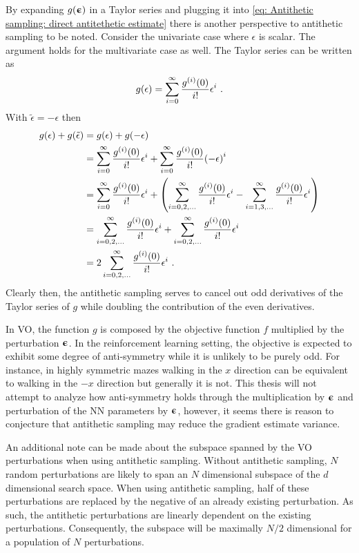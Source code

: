 By expanding $g({\boldsymbol{\upepsilon}})$ in a Taylor series and plugging it into \eqref{eq: Antithetic sampling: direct antitethetic estimate} there is another perspective to antithetic sampling to be noted. Consider the univariate case where $\epsilon$ is scalar. The argument holds for the multivariate case as well. The Taylor series can be written as
\begin{equation}
    g(\epsilon) = \sum_{i=0}^\infty \frac{g^{\left(i\right)}(0)}{i!}\epsilon^i \ .
\end{equation}
With $\tilde{\epsilon}=-\epsilon$ then
\begin{align}
    g(\epsilon) + g(\tilde{\epsilon})
    &= g(\epsilon) + g(-\epsilon)\\
    &= \sum_{i=0}^\infty \frac{g^\pa{i}(0)}{i!}\epsilon^i + \sum_{i=0}^\infty \frac{g^\pa{i}(0)}{i!}\pa{-\epsilon}^i\\
    &= \sum_{i=0}^\infty \frac{g^\pa{i}(0)}{i!}\epsilon^i + \pa{\sum_{i=0,2,\dots}^\infty \frac{g^\pa{i}(0)}{i!}\epsilon^i - \sum_{i=1,3,\dots}^\infty \frac{g^\pa{i}(0)}{i!}\epsilon^i}\\
    &= \sum_{i=0,2,\dots}^\infty \frac{g^\pa{i}(0)}{i!}\epsilon^i + \sum_{i=0,2,\dots}^\infty \frac{g^\pa{i}(0)}{i!}\epsilon^i\\
    &= 2\sum_{i=0,2,\dots}^\infty \frac{g^\pa{i}(0)}{i!}\epsilon^i \ .
\end{align}
Clearly then, the antithetic sampling serves to cancel out odd derivatives of the Taylor series of $g$ while doubling the contribution of the even derivatives. 

In \gls{VO}, the function $g$ is composed by the objective function $f$ multiplied by the perturbation ${\boldsymbol{\upepsilon}}$. In the reinforcement learning setting, the objective is expected to exhibit some degree of anti-symmetry while it is unlikely to be purely odd. For instance, in highly symmetric mazes walking in the $x$ direction can be equivalent to walking in the $-x$ direction but generally it is not.
This thesis will not attempt to analyze how anti-symmetry holds through the multiplication by ${\boldsymbol{\upepsilon}}$ and perturbation of the \gls{NN} parameters by ${\boldsymbol{\upepsilon}}$, however, it seems there is reason to conjecture that antithetic sampling may reduce the gradient estimate variance.

An additional note can be made about the subspace spanned by the \gls{VO} perturbations when using antithetic sampling. Without antithetic sampling, $N$ random perturbations are likely to span an $N$ dimensional subspace of the $d$ dimensional search space. When using antithetic sampling, half of these perturbations are replaced by the negative of an already existing perturbation. As such, the antithetic perturbations are linearly dependent on the existing perturbations. Consequently, the subspace will be maximally $N/2$ dimensional for a population of $N$ perturbations.

